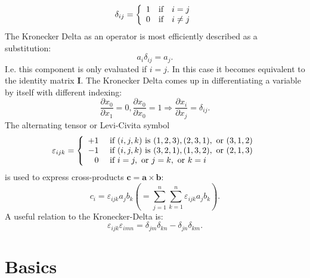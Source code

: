 \documentclass[m,times]{cgMA}
\begin{document}
\begin{equation}
  \delta _ { i j } = \left\{
    \begin{array} { l l l }
      { 1 } & {\text{if}} &  {i = j}  \\
      { 0 } & {\text{if}} &  { i \neq j }
  \end{array} \right.
\end{equation}
The Kronecker Delta as an operator is most efficiently described as a substitution:
\begin{equation}
  a _ { i } \delta _ { i j } = a _ { j }.
\end{equation}
I.e. this component is only evaluated if $i = j$. In this case it becomes equivalent to the identity matrix $\boldsymbol{I}$. The Kronecker Delta comes up in differentiating a variable by itself with different indexing:
\begin{equation}
  \frac{\partial{x_0}}{\partial{x_1}}=0, \frac{\partial{x_0}}{\partial{x_0}}=1  \Rightarrow \frac{\partial{x_i}}{\partial{x_j}} = \delta_{ij}.
\end{equation}
The alternating tensor or Levi-Civita symbol
\begin{equation}
  \varepsilon _ { i j k } = \left\{ \begin{array} { r l } { + 1 } & { \text { if } ( i , j , k ) \text { is } ( 1,2,3 ) , ( 2,3,1 ) , \text { or } ( 3,1,2 ) } \\ { - 1 } & { \text { if } ( i , j , k ) \text { is } ( 3,2,1 ) , ( 1,3,2 ) , \text { or } ( 2,1,3 ) } \\ { 0 } & { \text { if } i = j , \text { or } j = k , \text { or } k = i } \end{array} \right.
\end{equation}
is used to express cross-products $\boldsymbol{c}=\boldsymbol{a} \times \boldsymbol{b}$:
\begin{equation}
  c_i = \varepsilon_{ijk} a_j b_k \left(= \sum _ { j = 1 } ^ { n } \sum _ { k = 1 } ^ { n } \varepsilon_{ijk} a_j b_k\right).
\end{equation}
A useful relation to the Kronecker-Delta is:
\begin{equation} \label{eq:compact_levi}
  \varepsilon _ { i j k } \varepsilon _ { i m n } = \delta _ { j m } \delta _ { k n } - \delta _ { j n } \delta _ { k m }.
\end{equation}
\cite{MCGINTY:CONTINUUM}
\clearpage
\section{Basics}
\end{document}
